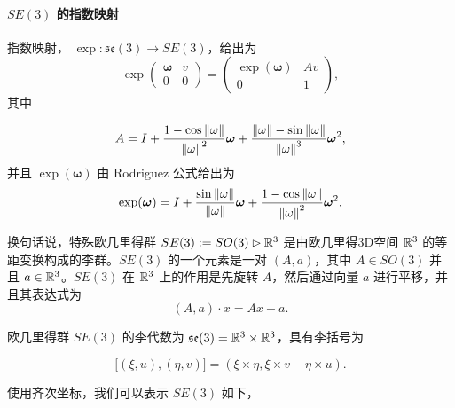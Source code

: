 \documentclass[11pt,fontset=founder]{ctexart}
\begin{document}
\paragraph{$SE(3)$ 的指数映射}

指数映射， $\exp :\mathfrak{se}(3)\rightarrow SE(3)$，给出为%
\begin{equation*}
\exp \left(
\begin{array}{cc}
\mathbf{\omega} & v \\
0 & 0%
\end{array}%
\right) =\left(
\begin{array}{cc}
\exp (\mathbf{\omega}) & Av \\
0 & 1%
\end{array}%
\right) ,
\end{equation*}%
其中

\begin{equation*}
A=I+\frac{1-\cos \left\Vert \omega \right\Vert }{\left\Vert \omega
\right\Vert ^{2}}\mathbf{\omega}+\frac{\left\Vert \omega \right\Vert -\sin
\left\Vert \omega \right\Vert }{\left\Vert \omega \right\Vert ^{3}}\mathbf{%
\omega}^{2},
\end{equation*}%
并且 $\exp (\mathbf{\omega})$ 由 Rodriguez 公式给出为%
\begin{equation*}
\exp (\mathbf{\omega})=I+\frac{\sin \left\Vert \omega \right\Vert }{%
\left\Vert \omega \right\Vert }\mathbf{\omega}+\frac{1-\cos \left\Vert
\omega \right\Vert }{\left\Vert \omega \right\Vert ^{2}}\mathbf{\omega}^{2}.
\end{equation*}

换句话说，特殊欧几里得群 $SE(3):=SO(3)\rhd \Bbb{R}^{3}$ 是由欧几里得3D空间 $\Bbb{R}^{3}$ 的等距变换构成的李群。$SE(3)$ 的一个元素是一对 $(A,a)$，其中 $A\in SO(3)$ 并且 $a\in \Bbb{R}^{3}$。$SE(3)$ 在 $\Bbb{R}^{3}$ 上的作用是先旋转 $A$，然后通过向量 $a$ 进行平移，并且其表达式为
\[
(A,a)\cdot x=Ax+a.
\]

欧几里得群 $SE(3)$ 的李代数为 $\mathfrak{se}(3)=\Bbb{R}^{3}\times \Bbb{R}^{3}$，具有李括号为

\begin{equation}
\lbrack (\xi ,u),(\eta ,v)]=(\xi \times \eta ,\xi \times v-\eta \times u).
\label{lbse3}
\end{equation}

使用齐次坐标，我们可以表示 $SE(3)$ 如下，
\end{document}
